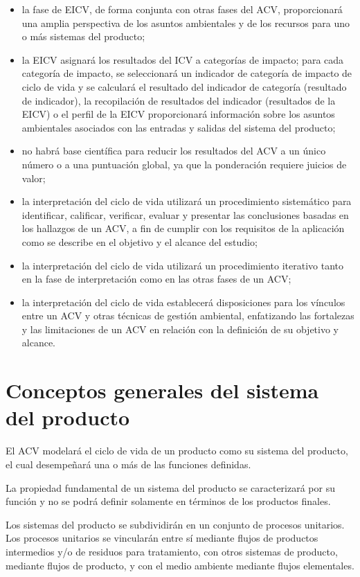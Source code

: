 \begin{itemize}
\begin{itemize}
  \end{itemize}
  \item la fase de EICV, de forma conjunta con otras fases del ACV, proporcionará una amplia perspectiva de los asuntos ambientales y de los recursos para uno o más sistemas del producto;
  \item la EICV asignará los resultados del ICV a categorías de impacto; para cada categoría de impacto, se seleccionará un indicador de categoría de impacto de ciclo de vida y se calculará el resultado del indicador de categoría (resultado de indicador), la recopilación de resultados del indicador (resultados de la EICV) o el perfil de la EICV proporcionará información sobre los asuntos ambientales asociados con las entradas y salidas del sistema del producto;
  \item no habrá base científica para reducir los resultados del ACV a un único número o a una puntuación global, ya que la ponderación requiere juicios de valor;
  \item la interpretación del ciclo de vida utilizará un procedimiento sistemático para identificar, calificar, verificar, evaluar y presentar las conclusiones basadas en los hallazgos de un ACV, a fin de cumplir con los requisitos de la aplicación como se describe en el objetivo y el alcance del estudio;
  \item la interpretación del ciclo de vida utilizará un procedimiento iterativo tanto en la fase de interpretación como en las otras fases de un ACV;
  \item la interpretación del ciclo de vida establecerá disposiciones para los vínculos entre un ACV y otras técnicas de gestión ambiental, enfatizando las fortalezas y las limitaciones de un ACV en relación con la definición de su objetivo y alcance.
\end{itemize}

\section{Conceptos generales del sistema del producto}

El ACV modelará el ciclo de vida de un producto como su sistema del producto, el cual desempeñará una o más de las funciones definidas.

La propiedad fundamental de un sistema del producto se caracterizará por su función y no se podrá definir solamente en términos de los productos finales.

Los sistemas del producto se subdividirán en un conjunto de procesos unitarios. Los procesos unitarios se vincularán entre sí mediante flujos de productos intermedios y/o de residuos para tratamiento, con otros sistemas de producto, mediante flujos de producto, y con el medio ambiente mediante flujos elementales.

